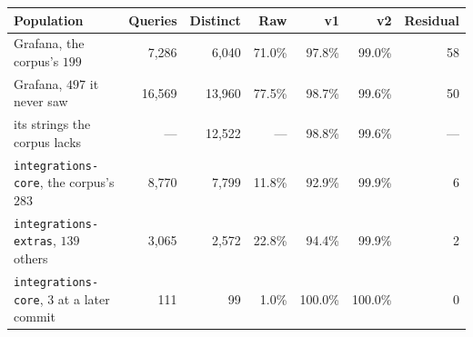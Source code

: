 \begin{tabular}{@{}lrrrrrr@{}}
\toprule
Population & Queries & Distinct & Raw & v1 & v2 & Residual \\
\midrule
Grafana, the corpus's $199$ & 7,286 & 6,040 & 71.0\% & 97.8\% & 99.0\% & 58 \\
Grafana, $497$ it never saw & 16,569 & 13,960 & 77.5\% & 98.7\% & 99.6\% & 50 \\
\quad its strings the corpus lacks & --- & 12,522 & --- & 98.8\% & 99.6\% & --- \\
\texttt{integrations-core}, the corpus's $283$ & 8,770 & 7,799 & 11.8\% & 92.9\% & 99.9\% & 6 \\
\texttt{integrations-extras}, $139$ others & 3,065 & 2,572 & 22.8\% & 94.4\% & 99.9\% & 2 \\
\texttt{integrations-core}, $3$ at a later commit & 111 & 99 & 1.0\% & 100.0\% & 100.0\% & 0 \\
\bottomrule
\end{tabular}
